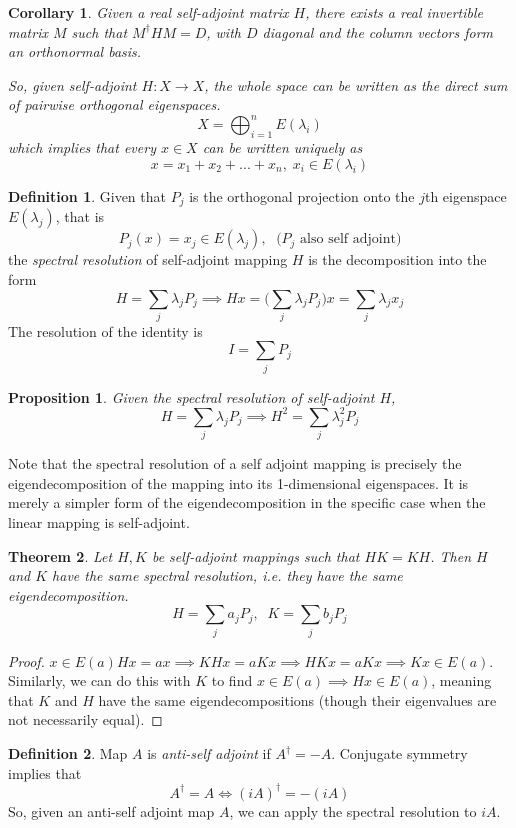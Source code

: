 \documentclass{article}
\newtheorem{theorem}{Theorem}[section]
\newtheorem{proposition}[theorem]{Proposition}
\newtheorem{corollary}{Corollary}[theorem]
\theoremstyle{remark}
\theoremstyle{definition}
\newtheorem{definition}{Definition}[section]
\begin{document}
\begin{corollary}
Given a real self-adjoint matrix $H$, there exists a real invertible matrix $M$ such that $M^\dagger H M = D$, with $D$ diagonal and the column vectors form an orthonormal basis.

So, given self-adjoint $H: X \longrightarrow X$, the whole space can be written as the direct sum of pairwise orthogonal eigenspaces. 
\[X = \bigoplus_{i=1}^n E(\lambda_i)\]
which implies that every $x \in X$ can be written uniquely as 
\[x = x_1 + x_2 + ... + x_n, \; x_i \in E(\lambda_i) \]
\end{corollary}

\begin{definition}
Given that $P_j$ is the orthogonal projection onto the $j$th eigenspace $E(\lambda_j)$, that is
\[P_j (x) = x_j \in E(\lambda_j), \; \text{ ($P_j$ also self adjoint)}\]
the \textit{spectral resolution} of self-adjoint mapping $H$ is the decomposition into the form 
\[H = \sum_j \lambda_j P_j \implies H x = \bigg( \sum_j \lambda_j P_j \bigg) x = \sum_j \lambda_j x_j\]
The resolution of the identity is
\[I = \sum_j P_j\]
\end{definition}

\begin{proposition}
Given the spectral resolution of self-adjoint $H$, 
\[H  = \sum_j \lambda_j P_j \implies H^2 = \sum_j \lambda_j^2 P_j\]
\end{proposition}

Note that the spectral resolution of a self adjoint mapping is precisely the eigendecomposition of the mapping into its 1-dimensional eigenspaces. It is merely a simpler form of the eigendecomposition in the specific case when the linear mapping is self-adjoint. 

\begin{theorem}
Let $H, K$ be self-adjoint mappings such that $H K = K H$. Then $H$ and $K$ have the same spectral resolution, i.e. they have the same eigendecomposition. 
\[H = \sum_j a_j P_j, \; \; K = \sum_j b_j P_j\]
\end{theorem}
\begin{proof}
$ x \in E(a) H x = a x \implies K H x = a K x \implies H K x = a K x \implies K x \in E(a)$. Similarly, we can do this with $K$ to find $x \in E(a) \implies H x \in E(a)$, meaning that $K$ and $H$ have the same eigendecompositions (though their eigenvalues are not necessarily equal). 
\end{proof}

\begin{definition}
Map $A$ is \textit{anti-self adjoint }if $A^\dagger = - A$. Conjugate symmetry implies that
\[ A^\dagger = A \iff (i A)^\dagger = - (i A)\]
So, given an anti-self adjoint map $A$, we can apply the spectral resolution to $iA$. 
\end{definition}
\end{document}
